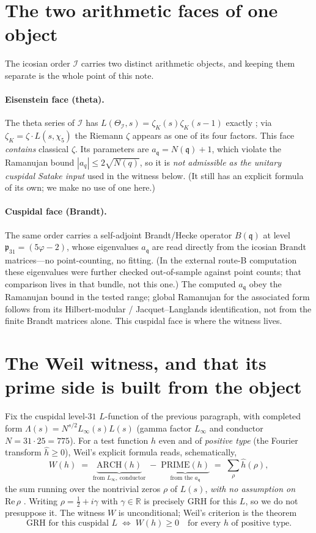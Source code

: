 \documentclass[11pt]{article}
\theoremstyle{definition}
\newcommand{\R}{\mathbb{R}}
\newcommand{\zetaK}{\zeta_{K}}
\newcommand{\Icos}{\mathcal{I}}
\newcommand{\fq}{\mathfrak{q}}
\begin{document}
\section{The two arithmetic faces of one object}
The icosian order $\Icos$ carries two distinct arithmetic objects, and keeping them
separate is the whole point of this note.

\paragraph{Eisenstein face (theta).} The theta series of $\Icos$ has
$L(\Theta_\Icos,s)=\zetaK(s)\zetaK(s-1)$ exactly \cite{IcosianTriad}; via
$\zetaK=\zeta\cdot L(s,\chi_5)$ the Riemann $\zeta$ appears as one of its four factors.
This face \emph{contains} classical $\zeta$. Its parameters are $a_\fq=N(\fq)+1$, which
violate the Ramanujan bound $|a_q|\le 2\sqrt{N(q)}$, so it is \emph{not admissible as the
unitary cuspidal Satake input} used in the witness below. (It still has an explicit
formula of its own; we make no use of one here.)

\paragraph{Cuspidal face (Brandt).} The same order carries a self-adjoint Brandt/Hecke
operator $B(\fq)$ at level $\mathfrak p_{31}=(5\varphi-2)$, whose eigenvalues $a_\fq$ are
read directly from the icosian Brandt matrices---no point-counting, no fitting. (In the
external route-B computation \cite{BrandtCuspidal} these eigenvalues were further checked
out-of-sample against point counts; that comparison lives in that bundle, not this one.)
The computed $a_\fq$ obey the Ramanujan bound in the tested range;
global Ramanujan for the associated form follows from its Hilbert-modular /
Jacquet--Langlands identification, not from the finite Brandt matrices alone. This
cuspidal face is where the witness lives.

\section{The Weil witness, and that its prime side is built from the object}
Fix the cuspidal level-$31$ $L$-function of the previous paragraph, with completed form
$\Lambda(s)=N^{s/2}L_\infty(s)L(s)$ (gamma factor $L_\infty$ and conductor
$N=31\cdot25=775$). For a test
function $h$ even and of \emph{positive type} (the Fourier transform $\widehat h\ge0$),
Weil's explicit formula reads, schematically,
\[
   W(h)\;=\;\underbrace{\mathrm{ARCH}(h)}_{\text{from }L_\infty,\ \text{conductor}}
   \;-\;\underbrace{\mathrm{PRIME}(h)}_{\text{from the }a_\fq}
   \;=\;\sum_{\rho} \widehat h(\rho),
\]
the sum running over the nontrivial zeros $\rho$ of $L(s)$, \emph{with no assumption on
$\mathrm{Re}\,\rho$} \cite{Weil}. Writing $\rho=\tfrac12+i\gamma$ with $\gamma\in\R$ is
precisely GRH for this $L$, so we do not presuppose it. The
witness $W$ is unconditional; Weil's criterion is the theorem
\[
   \text{GRH for this cuspidal } L \;\Longleftrightarrow\; W(h)\ge 0
   \quad\text{for every } h \text{ of positive type.}
\]
\end{document}

